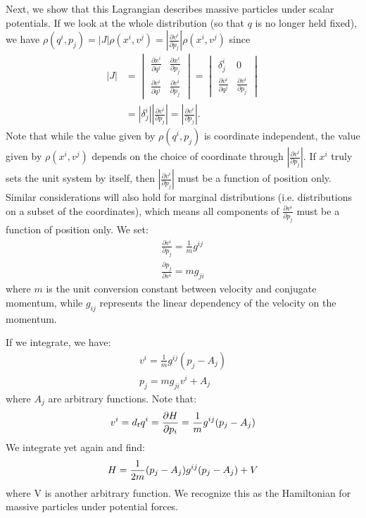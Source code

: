 \documentclass[letterpaper]{article}
\begin{document}
Next, we show that this Lagrangian describes massive particles under scalar potentials. If we look at the whole distribution (so that $q$ is no longer held fixed), we have $\rho(q^i, p_j) = |J| \rho(x^i, v^j) = \left|\frac{\partial v^i}{\partial p_j}\right| \rho(x^i, v^j)$ since
\begin{equation}
\begin{aligned}
|J| &= \begin{vmatrix}
\frac{\partial x^i}{\partial q^j} & \frac{\partial x^i}{\partial p_j} \\
\frac{\partial v^i}{\partial q^j} & \frac{\partial v^i}{\partial p_j}
\end{vmatrix}
= \begin{vmatrix}
\delta^i_j & 0 \\
\frac{\partial v^i}{\partial q^j} & \frac{\partial v^i}{\partial p_j}
\end{vmatrix} \\
&= \left|\delta^i_j\right| \left|\frac{\partial v^i}{\partial p_j}\right| 
= \left|\frac{\partial v^i}{\partial p_j}\right|.
\end{aligned}
\end{equation}
Note that while the value given by $\rho(q^i, p_j)$ is coordinate independent, the value given by $\rho(x^i, v^j)$ depends on the choice of coordinate through $\left|\frac{\partial v^i}{\partial p_j}\right|$. If $x^i$ truly sets the unit system by itself, then $\left|\frac{\partial v^i}{\partial p_j}\right|$ must be a function of position only. Similar considerations will also hold for marginal distributions (i.e. distributions on a subset of the coordinates), which means all components of $\frac{\partial v^i}{\partial p_j}$ must be a function of position only. We set:
\begin{equation}
\begin{aligned}
\frac{\partial v^i}{\partial p_j} = \frac{1}{m} g^{ij} \\
\frac{\partial p_j}{\partial v^i} = m g_{ji}
\end{aligned}
\end{equation}
where $m$ is the unit conversion constant between velocity and conjugate momentum, while $g_{ij}$ represents the linear dependency of the velocity on the momentum. 

If we integrate, we have:
\begin{equation}
\begin{aligned}
v^i = \frac{1}{m} g^{ij}(p_j - A_j) \\
p_j = m g_{ji} v^i + A_j
\end{aligned}
\end{equation}
where $A_j$ are arbitrary functions. Note that:
\begin{equation}
v^i = d_t q^i = \frac{\partial H }{\partial p_i} = \frac{1}{m} g^{ij}(p_j - A_j) \\
\end{equation}
We integrate yet again and find:
\begin{equation}
H = \frac{1}{2m} (p_j - A_j) g^{ij}(p_j - A_j) + V \\
\end{equation}
where V is another arbitrary function. We recognize this as the Hamiltonian for massive particles under potential forces.
\end{document}
